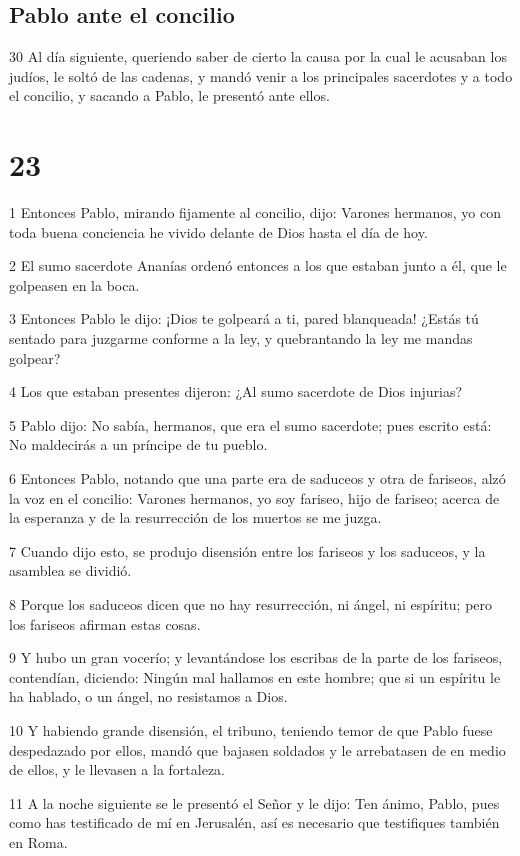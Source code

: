\section*{Pablo ante el concilio}

\par 30 Al día siguiente, queriendo saber de cierto la causa por la cual le acusaban los judíos, le soltó de las cadenas, y mandó venir a los principales sacerdotes y a todo el concilio, y sacando a Pablo, le presentó ante ellos.

\chapter{23}

\par 1 Entonces Pablo, mirando fijamente al concilio, dijo: Varones hermanos, yo con toda buena conciencia he vivido delante de Dios hasta el día de hoy.
\par 2 El sumo sacerdote Ananías ordenó entonces a los que estaban junto a él, que le golpeasen en la boca.
\par 3 Entonces Pablo le dijo: ¡Dios te golpeará a ti, pared blanqueada! ¿Estás tú sentado para juzgarme conforme a la ley, y quebrantando la ley me mandas golpear?
\par 4 Los que estaban presentes dijeron: ¿Al sumo sacerdote de Dios injurias?
\par 5 Pablo dijo: No sabía, hermanos, que era el sumo sacerdote; pues escrito está: No maldecirás a un príncipe de tu pueblo.
\par 6 Entonces Pablo, notando que una parte era de saduceos y otra de fariseos, alzó la voz en el concilio: Varones hermanos, yo soy fariseo, hijo de fariseo; acerca de la esperanza y de la resurrección de los muertos se me juzga.
\par 7 Cuando dijo esto, se produjo disensión entre los fariseos y los saduceos, y la asamblea se dividió.
\par 8 Porque los saduceos dicen que no hay resurrección, ni ángel, ni espíritu; pero los fariseos afirman estas cosas.
\par 9 Y hubo un gran vocerío; y levantándose los escribas de la parte de los fariseos, contendían, diciendo: Ningún mal hallamos en este hombre; que si un espíritu le ha hablado, o un ángel, no resistamos a Dios.
\par 10 Y habiendo grande disensión, el tribuno, teniendo temor de que Pablo fuese despedazado por ellos, mandó que bajasen soldados y le arrebatasen de en medio de ellos, y le llevasen a la fortaleza.
\par 11 A la noche siguiente se le presentó el Señor y le dijo: Ten ánimo, Pablo, pues como has testificado de mí en Jerusalén, así es necesario que testifiques también en Roma.

